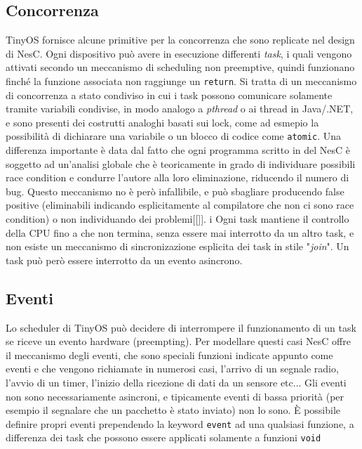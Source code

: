 \documentclass[pdftex,12pt,a4paper,italian,openany]{book}
\begin{document}
\subsection{Concorrenza}
TinyOS fornisce alcune primitive per la concorrenza che sono replicate nel design di NesC.
Ogni dispositivo può avere in esecuzione differenti \emph{task}, i quali vengono attivati 
secondo un 
meccanismo di scheduling non preemptive, quindi funzionano finché la funzione associata non 
raggiunge un \texttt{return}. Si tratta di un meccanismo di concorrenza a stato condiviso in cui 
i task possono comunicare solamente tramite variabili condivise, in modo analogo a 
\emph{pthread} o ai thread in Java/.NET, e sono presenti dei costrutti analoghi basati sui lock, come ad esmepio la possibilità di dichiarare una variabile o un blocco di codice come \texttt{atomic}.
Una differenza importante è data dal fatto che ogni programma scritto in del NesC è soggetto ad 
un'analisi globale che è teoricamente in grado di individuare possibili race condition e 
condurre l'autore alla loro eliminazione, riducendo il numero di bug. 
Questo meccanismo no è però infallibile, e può sbagliare producendo false positive 
(eliminabili indicando esplicitamente al compilatore che non ci sono race condition) o non 
individuando dei problemi[[]]. i
Ogni task mantiene il controllo della CPU fino a che non termina, senza essere mai interrotto da un altro task, e non esiste un meccanismo di sincronizazione esplicita 
dei task in stile "\emph{join}".
Un task può però essere interrotto da un evento asincrono.


\subsection{Eventi}
Lo scheduler di TinyOS può decidere di interrompere il funzionamento di un task se riceve un 
evento hardware (preempting). Per modellare questi casi NesC offre il meccanismo degli eventi, 
che sono speciali funzioni indicate appunto come eventi e che vengono richiamate in numerosi casi, l'arrivo di un segnale radio, l'avvio di un timer, l'inizio della ricezione di dati da un sensore etc...
Gli eventi non sono necessariamente asincroni, e tipicamente eventi di bassa priorità (per esempio il segnalare che un pacchetto è stato inviato) non lo sono.
\`E possibile definire propri eventi prependendo la keyword \texttt{event} ad una qualsiasi 
funzione, a differenza dei task che possono essere applicati solamente a funzioni \texttt{void}

 
\end{document}
